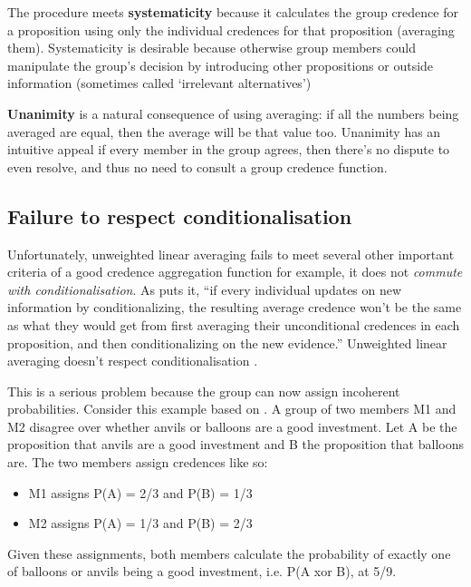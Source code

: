 \documentclass{article}
\begin{document}
The procedure meets \textbf{systematicity} because it calculates the group credence for a proposition using only the individual credences for that proposition (averaging them). Systematicity is desirable because otherwise group members could manipulate the group's decision by introducing other propositions or outside information (sometimes called `irrelevant alternatives')

\textbf{Unanimity} is a natural consequence of using averaging: if all the numbers being averaged are equal, then the average will be that value too. Unanimity has an intuitive appeal \textemdash{} if every member in the group agrees, then there's no dispute to even resolve, and thus no need to consult a group credence function. 

\subsection{Failure to respect conditionalisation}

Unfortunately, unweighted linear averaging fails to meet several other important criteria of a good credence aggregation function \textemdash{} for example, it does not \textit{commute with conditionalisation}. As \citet[pg. 1290]{russell2015groupthink} puts it, ``if every individual updates on new information by conditionalizing, the resulting average credence won't be the same as what they would get from first averaging their unconditional credences in each proposition, and then conditionalizing on the new evidence.'' Unweighted linear averaging doesn't respect conditionalisation \citep[pg. 87]{loewer1985destroying}.

This is a serious problem because the group can now assign incoherent probabilities. Consider this example based on \citet[pg. 1288]{russell2015groupthink}. A group of two members M1 and M2 disagree over whether anvils or balloons are a good investment. Let A be the proposition that anvils are a good investment and B the proposition that balloons are. The two members assign credences like so:

\begin{itemize}
	\item M1 assigns P(A) = 2/3 and P(B) = 1/3
	\item M2 assigns P(A) = 1/3 and P(B) = 2/3
\end{itemize}

Given these assignments, both members calculate the probability of exactly one of balloons or anvils being a good investment, i.e. P(A xor B), at 5/9. 
\end{document}
